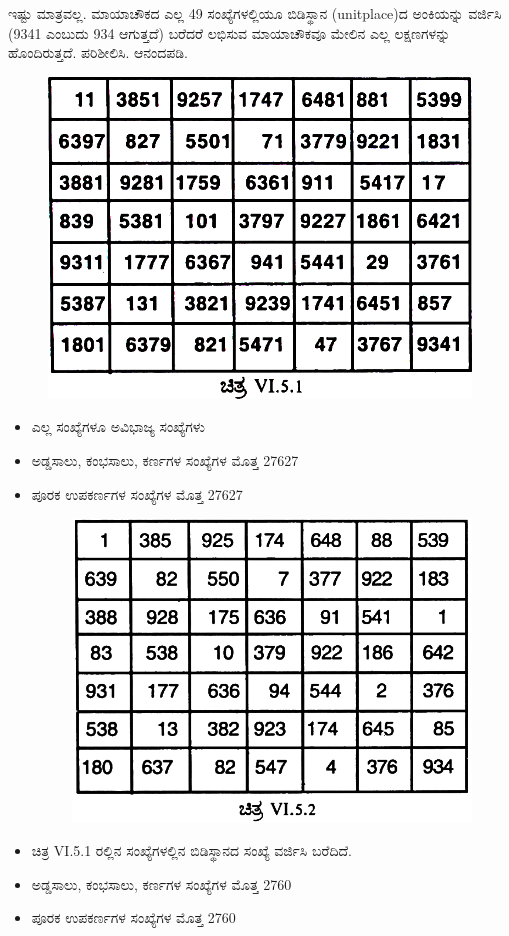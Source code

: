 ಇಷ್ಟು ಮಾತ್ರವಲ್ಲ. ಮಾಯಾಚೌಕದ ಎಲ್ಲ 49 ಸಂಖ್ಯೆಗಳಲ್ಲಿಯೂ ಬಿಡಿಸ್ಥಾನ (unitplace)ದ ಅಂಕಿಯನ್ನು ವರ್ಜಿಸಿ (9341 ಎಂಬುದು 934 ಆಗುತ್ತದೆ) ಬರೆದರೆ \hbox{ಲಭಿಸುವ} ಮಾಯಾಚೌಕವೂ ಮೇಲಿನ ಎಲ್ಲ ಲಕ್ಷಣಗಳನ್ನು ಹೊಂದಿರುತ್ತದೆ. ಪರಿಶೀಲಿಸಿ. ಆನಂದಪಡಿ.
\begin{figure}[H]
\includegraphics{src/figures/chap5/fig5-6.jpg}
\end{figure}
\begin{itemize}
	\item ಎಲ್ಲ ಸಂಖ್ಯೆಗಳೂ ಅವಿಭಾಜ್ಯ ಸಂಖ್ಯೆಗಳು
	\item ಅಡ್ಡಸಾಲು, ಕಂಭಸಾಲು, ಕರ್ಣಗಳ ಸಂಖ್ಯೆಗಳ ಮೊತ್ತ 27627
	\item ಪೂರಕ ಉಪಕರ್ಣಗಳ ಸಂಖ್ಯೆಗಳ ಮೊತ್ತ 27627
	\begin{figure}[H]
	\includegraphics{src/figures/chap5/fig5-7.jpg}
	\end{figure}
	\item ಚಿತ್ರ VI.5.1 ರಲ್ಲಿನ ಸಂಖ್ಯೆಗಳಲ್ಲಿನ ಬಿಡಿಸ್ಥಾನದ ಸಂಖ್ಯೆ ವರ್ಜಿಸಿ ಬರೆದಿದೆ.
	\item ಅಡ್ಡಸಾಲು, ಕಂಭಸಾಲು, ಕರ್ಣಗಳ ಸಂಖ್ಯೆಗಳ ಮೊತ್ತ 2760
	\item ಪೂರಕ ಉಪಕರ್ಣಗಳ ಸಂಖ್ಯೆಗಳ ಮೊತ್ತ 2760
\end{itemize}

